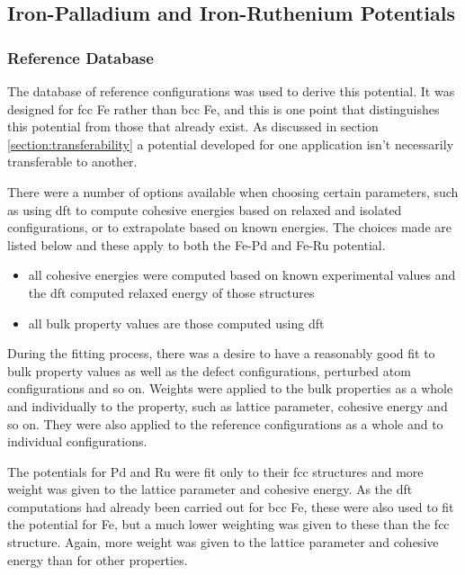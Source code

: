 \FloatBarrier
\subsection{Iron-Palladium and Iron-Ruthenium Potentials}
\label{section:fepdpotentialresult}

\subsubsection{Reference Database}

The database of reference configurations was used to derive this potential.  It was designed for \acrshort{fcc} Fe rather than \acrshort{bcc} Fe, and this is one point that distinguishes this potential from those that already exist.  As discussed in section \ref{section:transferability} a potential developed for one application isn't necessarily transferable to another.

There were a number of options available when choosing certain parameters, such as using \acrshort{dft} to compute cohesive energies based on relaxed and isolated configurations, or to extrapolate based on known energies.  The choices made are listed below and these apply to both the Fe-Pd and Fe-Ru potential.

\begin{itemize}
\item all cohesive energies were computed based on known experimental values and the \acrshort{dft} computed relaxed energy of those structures
\item all bulk property values are those computed using \acrshort{dft}
\end{itemize}

During the fitting process, there was a desire to have a reasonably good fit to bulk property values as well as the defect configurations, perturbed atom configurations and so on.  Weights were applied to the bulk properties as a whole and individually to the property, such as lattice parameter, cohesive energy and so on.  They were also applied to the reference configurations as a whole and to individual configurations. 

The potentials for \Gls{Pd} and \Gls{Ru} were fit only to their \acrshort{fcc} structures and more weight was given to the lattice parameter and cohesive energy.  As the \acrshort{dft} computations had already been carried out for \acrshort{bcc} \Gls{Fe}, these were also used to fit the potential for \Gls{Fe}, but a much lower weighting was given to these than the \acrshort{fcc} structure.  Again, more weight was given to the lattice parameter and cohesive energy than for other properties.

